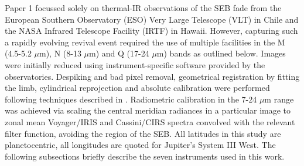 \documentclass[final,authoryear,5p,times,twocolumn]{elsarticle}
\begin{document}
Paper 1 focussed solely on thermal-IR observations of the SEB fade from the European Southern Observatory (ESO) Very Large Telescope (VLT) in Chile and the NASA Infrared Telescope Facility (IRTF) in Hawaii.  However, capturing such a rapidly evolving revival event required the use of multiple facilities in the M (4.5-5.2 $\mu$m), N (8-13 $\mu$m) and Q (17-24 $\mu$m) bands as outlined below.  Images were initially reduced using instrument-specific software provided by the observatories.  Despiking and bad pixel removal, geometrical registration by fitting the limb, cylindrical reprojection and absolute calibration were performed following techniques described in \citet{09fletcher_imaging}.  Radiometric calibration in the 7-24 $\mu$m range was achieved via scaling the central meridian radiances in a particular image to zonal mean Voyager/IRIS and Cassini/CIRS spectra convolved with the relevant filter function, avoiding the region of the SEB.  All latitudes in this study are planetocentric, all longitudes are quoted for Jupiter's System III West.  The following subsections briefly describe the seven instruments used in this work.
\end{document}
